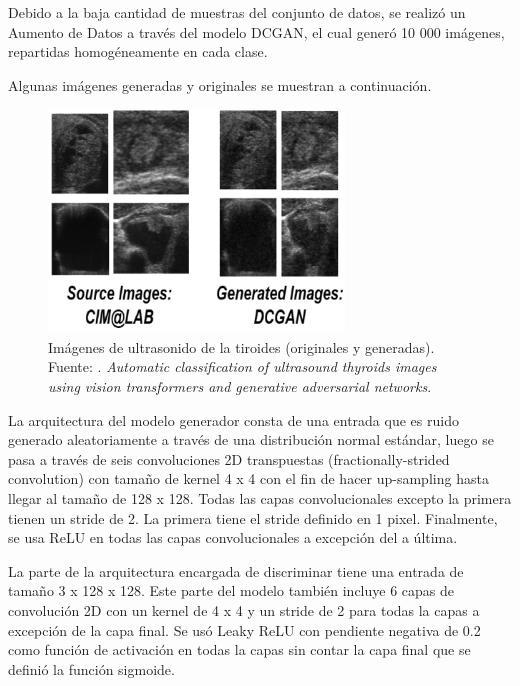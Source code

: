 Debido a la baja cantidad de muestras del conjunto de datos, se realizó un Aumento de Datos a través del modelo DCGAN, el cual generó 10 000 imágenes, repartidas homogéneamente en cada clase.

Algunas imágenes generadas y originales se muestran a continuación.

\begin{figure}[H]
	\begin{center}
		\includegraphics[width=0.70\textwidth]{2/figures/vitpaper6_part1.png}
		\caption[Imágenes de ultrasonido de la tiroides (originales y generadas)]{Imágenes de ultrasonido de la tiroides (originales y generadas). \\
		Fuente: \cite{pr_JERBI2023autoclassViTGAN}. \textit{Automatic classification of ultrasound thyroids images using vision transformers and generative adversarial networks}.}
		\label{2:fig122}
	\end{center}
\end{figure}

La arquitectura del modelo generador consta de una entrada que es ruido generado aleatoriamente a través de una distribución normal estándar, luego se pasa a través de seis convoluciones 2D transpuestas (fractionally-strided convolution) con tamaño de kernel 4 x 4 con el fin de hacer up-sampling hasta llegar al tamaño de 128 x 128. Todas las capas convolucionales excepto la primera tienen un stride de 2. La primera tiene el stride definido en 1 pixel. Finalmente, se usa ReLU en todas las capas convolucionales a excepción del a última. 

La parte de la arquitectura encargada de discriminar tiene una entrada de tamaño 3 x 128 x 128. Este parte del modelo también incluye 6 capas de convolución 2D con un kernel de 4 x 4 y un stride de 2 para todas la capas a excepción de la capa final. Se usó Leaky ReLU con pendiente negativa de 0.2 como función de activación en todas la capas sin contar la capa final que se definió la función sigmoide.

